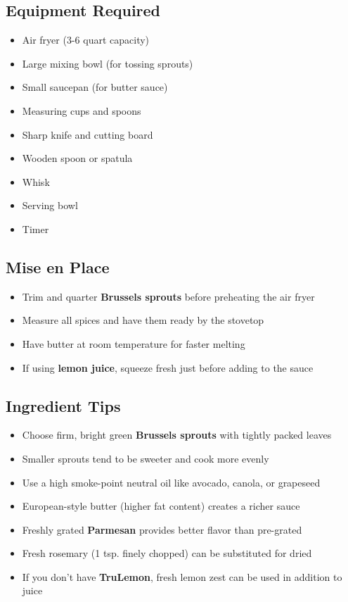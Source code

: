 \documentclass[11pt,letterpaper]{article}
\begin{document}
{\small
\setlength{\columnsep}{20pt}
\setlength{\multicolsep}{6pt}
\begin{multicols}{2}
\setlength{\parindent}{0pt}
\setlength{\parskip}{4pt}

\subsection*{Equipment Required}
\begin{itemize}
    \item Air fryer (3-6 quart capacity)
    \item Large mixing bowl (for tossing sprouts)
    \item Small saucepan (for butter sauce)
    \item Measuring cups and spoons
    \item Sharp knife and cutting board
    \item Wooden spoon or spatula
    \item Whisk
    \item Serving bowl
    \item Timer
\end{itemize}

\subsection*{Mise en Place}
\begin{itemize}
    \item Trim and quarter \textbf{Brussels sprouts} before preheating the air fryer
    \item Measure all spices and have them ready by the stovetop
    \item Have butter at room temperature for faster melting
    \item If using \textbf{lemon juice}, squeeze fresh just before adding to the sauce
\end{itemize}

\subsection*{Ingredient Tips}
\begin{itemize}
    \item Choose firm, bright green \textbf{Brussels sprouts} with tightly packed leaves
    \item Smaller sprouts tend to be sweeter and cook more evenly
    \item Use a high smoke-point neutral oil like avocado, canola, or grapeseed
    \item European-style butter (higher fat content) creates a richer sauce
    \item Freshly grated \textbf{Parmesan} provides better flavor than pre-grated
    \item Fresh rosemary (1 tsp. finely chopped) can be substituted for dried
    \item If you don't have \textbf{TruLemon}, fresh lemon zest can be used in addition to juice
\end{itemize}


\end{multicols}}
\end{document}
